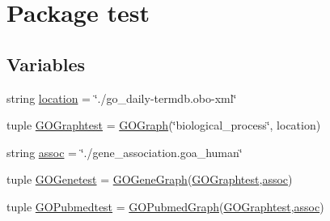 \hypertarget{namespacetest}{
\section{Package test}
\label{namespacetest}
}
\subsection*{Variables}
\begin{DoxyCompactItemize}
\item 
string \hyperlink{namespacetest_a4ee7d63d9426ae32ba96ad2f0e171511}{location} = \char`\"{}./go\_\-daily-\/termdb.obo-\/xml\char`\"{}
\item 
tuple \hyperlink{namespacetest_a49256f3800de70e9aabf11ea0c3bb8e1}{GOGraphtest} = \hyperlink{class_g_o_graph_1_1_g_o_graph}{GOGraph}(\char`\"{}biological\_\-process\char`\"{}, location)
\item 
string \hyperlink{namespacetest_adb8b1e2a5df72522e42bc012571e75cd}{assoc} = \char`\"{}./gene\_\-association.goa\_\-human\char`\"{}
\item 
tuple \hyperlink{namespacetest_ab48a47ac8dcf21d32cff24c492f085c1}{GOGenetest} = \hyperlink{class_g_o_gene_graph_1_1_g_o_gene_graph}{GOGeneGraph}(\hyperlink{namespacetest_a49256f3800de70e9aabf11ea0c3bb8e1}{GOGraphtest},\hyperlink{namespacetest_adb8b1e2a5df72522e42bc012571e75cd}{assoc})
\item 
tuple \hyperlink{namespacetest_a2565076d50762c7d466830ecbabb1671}{GOPubmedtest} = \hyperlink{class_g_o_pubmed_graph_1_1_g_o_pubmed_graph}{GOPubmedGraph}(\hyperlink{namespacetest_a49256f3800de70e9aabf11ea0c3bb8e1}{GOGraphtest},\hyperlink{namespacetest_adb8b1e2a5df72522e42bc012571e75cd}{assoc})
\end{DoxyCompactItemize}


